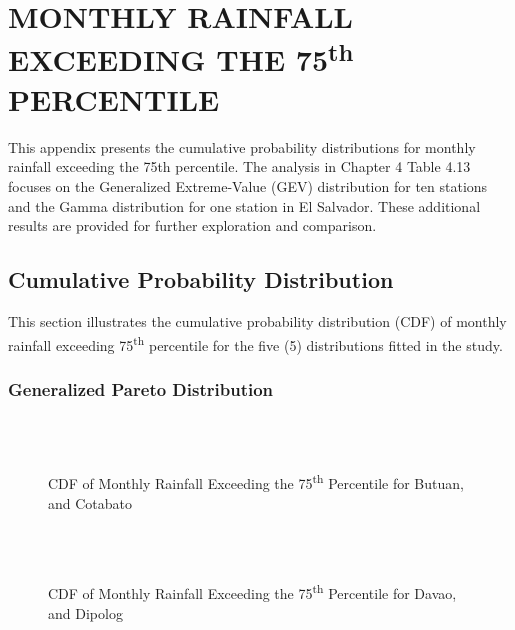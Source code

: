 \chapter{MONTHLY RAINFALL EXCEEDING THE 75\texorpdfstring{\textsuperscript{th}}{th} PERCENTILE}

This appendix presents the cumulative probability distributions for monthly rainfall exceeding the 75th percentile. The analysis in Chapter 4 Table 4.13 focuses on the Generalized Extreme-Value (GEV) distribution for ten stations and the Gamma distribution for one station in El Salvador. These additional results are provided for further exploration and comparison.


\section{Cumulative Probability Distribution}
This section illustrates the cumulative probability distribution (CDF) of monthly rainfall exceeding 75\textsuperscript{th} percentile for the five (5) distributions fitted in the study.

\subsection{Generalized Pareto Distribution}

\begin{figure}[H]
  \centering
  \\
  \\
\caption{CDF of Monthly Rainfall Exceeding the 75\textsuperscript{th} Percentile for Butuan, and Cotabato}
  \label{fig:monthly_0.75_appendix_gpd_pt1}
\end{figure}

\begin{figure}[H]
  \centering  
  \\
  \\
\caption{CDF of Monthly Rainfall Exceeding the 75\textsuperscript{th} Percentile for Davao, and Dipolog}
  \label{fig:monthly_0.75_appendix_gpd_pt2}
\end{figure}

